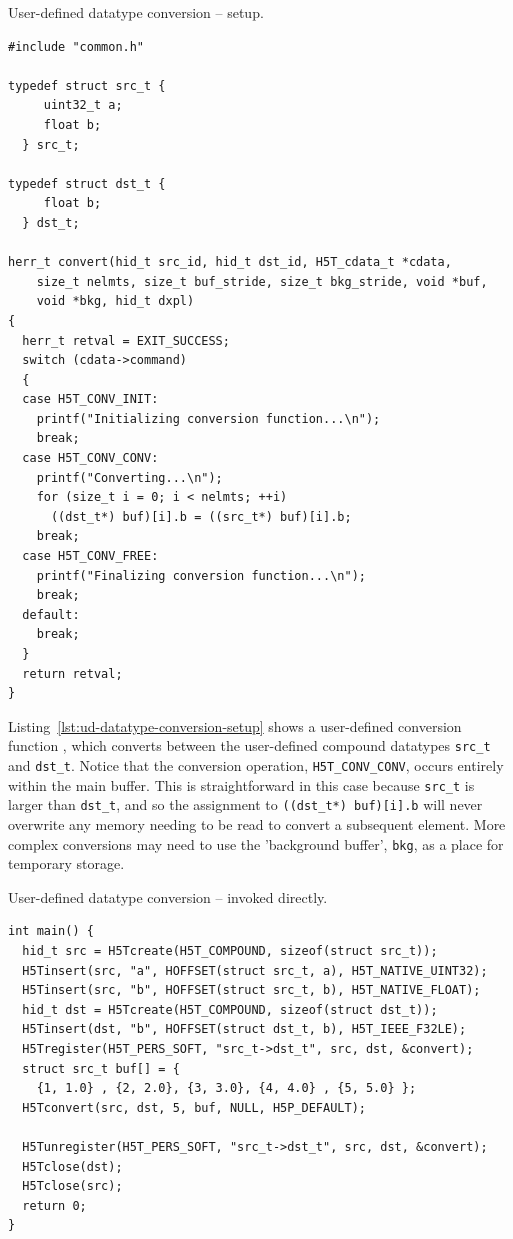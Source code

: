 \begin{listing}
\centering
\caption{User-defined datatype conversion -- setup.}
\label{lst:ud-datatype-conversion-setup}
\begin{verbatim}
#include "common.h"

typedef struct src_t {
     uint32_t a;
     float b;
  } src_t;

typedef struct dst_t {
     float b;
  } dst_t;

herr_t convert(hid_t src_id, hid_t dst_id, H5T_cdata_t *cdata,
    size_t nelmts, size_t buf_stride, size_t bkg_stride, void *buf,
    void *bkg, hid_t dxpl)
{
  herr_t retval = EXIT_SUCCESS;
  switch (cdata->command)
  {
  case H5T_CONV_INIT:
    printf("Initializing conversion function...\n");
    break;
  case H5T_CONV_CONV:
    printf("Converting...\n");
    for (size_t i = 0; i < nelmts; ++i)
      ((dst_t*) buf)[i].b = ((src_t*) buf)[i].b;
    break;
  case H5T_CONV_FREE:
    printf("Finalizing conversion function...\n");
    break;
  default:
    break;
  }
  return retval;
}
\end{verbatim}
\end{listing}

Listing~\ref{lst:ud-datatype-conversion-setup} shows a user-defined conversion function , which converts between the user-defined compound datatypes \texttt{src\_t} and \texttt{dst\_t}. Notice that the conversion operation, \texttt{H5T\_CONV\_CONV}, occurs entirely within the main buffer. This is straightforward in this case because \texttt{src\_t} is larger than \texttt{dst\_t}, and so the assignment to \texttt{((dst\_t*) buf)[i].b} will never overwrite any memory needing to be read to convert a subsequent element. More complex conversions may need to use the 'background buffer', \texttt{bkg}, as a place for temporary storage.

\begin{listing}
\centering
\caption{User-defined datatype conversion -- invoked directly.}
\label{lst:ud-datatype-conversion-direct}
\begin{verbatim}
int main() {
  hid_t src = H5Tcreate(H5T_COMPOUND, sizeof(struct src_t));
  H5Tinsert(src, "a", HOFFSET(struct src_t, a), H5T_NATIVE_UINT32);
  H5Tinsert(src, "b", HOFFSET(struct src_t, b), H5T_NATIVE_FLOAT);
  hid_t dst = H5Tcreate(H5T_COMPOUND, sizeof(struct dst_t));
  H5Tinsert(dst, "b", HOFFSET(struct dst_t, b), H5T_IEEE_F32LE);
  H5Tregister(H5T_PERS_SOFT, "src_t->dst_t", src, dst, &convert);
  struct src_t buf[] = {
    {1, 1.0} , {2, 2.0}, {3, 3.0}, {4, 4.0} , {5, 5.0} };
  H5Tconvert(src, dst, 5, buf, NULL, H5P_DEFAULT);

  H5Tunregister(H5T_PERS_SOFT, "src_t->dst_t", src, dst, &convert);
  H5Tclose(dst);
  H5Tclose(src);
  return 0;
}
\end{verbatim}
\end{listing}

